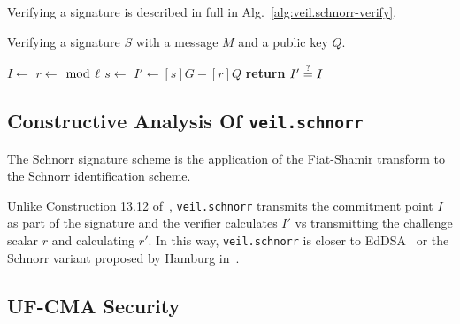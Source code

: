 Verifying a signature is described in full in Alg.~\ref{alg:veil.schnorr-verify}.

\begin{algorithm}[!htp]
    \caption{
        Verifying a signature $S$ with a message $M$ and a public key $Q$.
    }
    \begin{algorithmic}
            \State {}
            \State {}
            \State {}
            \State
            \State {}
            \State
            \State $I \gets $ 
            \State $r \gets$  $\bmod~\ell$
            \State
            \State $s \gets $ 
            \State $I' \gets [s]G - [r]Q$
            \State
            \State \textbf{return} $I' \stackrel{?}{=} I$
        \EndFunction
    \end{algorithmic}
    \label{alg:veil.schnorr-verify}
\end{algorithm}

\subsection{Constructive Analysis Of \texttt{veil.schnorr}}\label{subsec:veil.schnorr-analysis}

The Schnorr signature scheme is the application of the Fiat-Shamir transform to the Schnorr identification scheme.

Unlike Construction 13.12 of~\cite[p. 482]{katz2020}, \texttt{veil.schnorr} transmits the commitment point $I$ as part
of the signature and the verifier calculates $I'$ vs transmitting the challenge scalar $r$ and calculating $r'$.
In this way, \texttt{veil.schnorr} is closer to EdDSA~\cite{brendel2021} or the Schnorr variant proposed by Hamburg
in~\cite{hamburg2017}.

\subsection{UF-CMA Security}\label{subsec:veil.schnorr-uf-cma}

